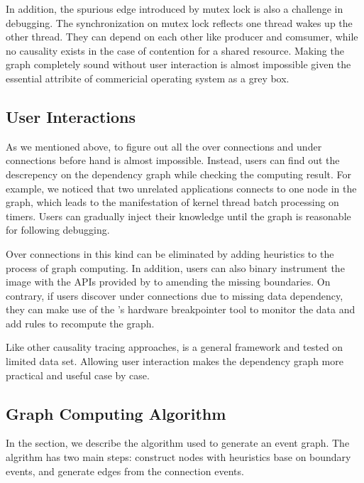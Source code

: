 In addition, the spurious edge introduced by mutex lock is also a challenge in
debugging. The synchronization on mutex lock reflects one thread wakes up the
other thread. They can depend on each other like producer and comsumer, while
no causality exists in the case of contention for a shared resource. Making the
graph completely sound without user interaction is almost impossible given the
essential attribite of commericial operating system as a grey box.

\subsection{User Interactions}


As we mentioned above, to figure out all the over connections and under
connections before hand is almost impossible. Instead, users can find out the
descrepency on the dependency graph while checking the computing result. For
example, we noticed that two unrelated applications connects to one node in the
graph, which leads to the manifestation of kernel thread batch processing on
timers. Users can gradually inject their knowledge until the graph is reasonable
for following debugging.

Over connections in this kind can be eliminated by adding heuristics to the
process of graph computing. In addition, users can also binary instrument the
image with the APIs provided by \xxx to amending the missing boundaries. On
contrary, if users discover under connections due to missing data dependency,
they can make use of the \xxx's hardware breakpointer tool to monitor the data
and add rules to recompute the graph.

Like other causality tracing approaches, \xxx is a general framework and tested
on limited data set. Allowing user interaction makes the dependency graph more
practical and useful case by case.

\subsection{Graph Computing Algorithm}

In the section, we describe the algorithm \xxx used to generate an event graph.
The algrithm has two main steps: construct nodes with heuristics base on
boundary events, and generate edges from the connection events.

